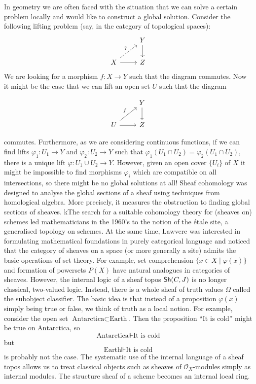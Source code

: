 In geometry we are often faced with the situation that we can solve a certain problem locally and would like to construct a global solution. Consider the following lifting problem (say, in the category of topological spaces):
\[
	\begin{tikzcd}
		& Y\\
		X & Z
		\arrow["{?}", dashed, from=2-1, to=1-2]
		\arrow[from=1-2, to=2-2]
		\arrow[from=2-1, to=2-2]
	\end{tikzcd}
\]
We are looking for a morphism $f \colon X \to Y$ such that the diagram commutes. Now it might be the case that we can lift an open set $U$ such that the diagram

\[
	\begin{tikzcd}
		& Y\\
		U & Z
		\arrow["f",from=2-1, to=1-2]
		\arrow[from=1-2, to=2-2]
		\arrow[from=2-1, to=2-2]
	\end{tikzcd}
\]

commutes. Furthermore, as we are considering continuous functions, if we can find lifts $\varphi_1  \colon U_1 \to Y$ and $\varphi_2 \colon U_2 \to Y$ such that $\varphi_1(U_1 \cap U_2) = \varphi_2(U_1 \cap U_2)$, there is a unique lift $\varphi \colon U_1 \cup U_2 \to Y$. However, given an open cover $\{U_i\}$ of $X$ it might be impossible to find morphisms $\varphi_i$ which are compatible on all intersections, so there might be no global solutions at all! Sheaf cohomology was designed to analyse the global sections of a sheaf using techniques from homological algebra. More precisely, it measures the obstruction to finding global sections of sheaves. kThe search for a suitable cohomology theory for (sheaves on) schemes led mathematicians in the 1960's to the notion of the \'etale site, a generalised topology on schemes. At the same time, Lawvere was interested in formulating mathematical foundations in purely categorical language and noticed that the category of sheaves on a space (or more generally a site) admits the basic operations of set theory. For example, set comprehension $\{x \in X \mid \varphi(x)\}$ and formation of powersets $P(X)$ have natural analogues in categories of sheaves. However, the internal logic of a sheaf topos $\operatorname{\mathsf{Sh}}(C,J)$ is no longer classical, two-valued logic. Instead, there is a whole sheaf of truth values $\Omega$ called the subobject classifier. The basic idea is that instead of a proposition $\varphi(x)$ simply being true or false, we think of truth as a local notion. For example, consider the open set $\text{Antarctica} \subset \text{Earth}$. Then the proposition $\text{``It~is~cold''}$ might be true on $\text{Antarctica}$, so
\[
	\text{Antarctica} \Vdash \text{It is cold}
\]
but
\[
	\text{Earth} \Vdash \text{It is cold}
\]
is probably not the case. The systematic use of the internal language of a sheaf topos allows us to treat classical objects such as sheaves of $\mathcal{O}_X$-modules simply as internal modules. The structure sheaf of a scheme becomes an internal local ring.

